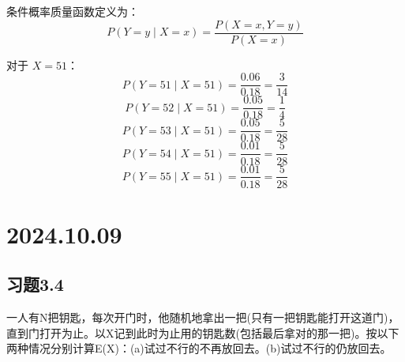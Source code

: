 \documentclass[UTF8]{report}
\theoremstyle{MyLineTheoremStyle} %
\theoremstyle{MyBlockTheoremStyle} %
\theoremstyle{MySubsubsectionStyle} %
\begin{document}
条件概率质量函数定义为：
\[
P(Y = y \mid X = x) = \frac{P(X = x, Y = y)}{P(X = x)}
\]

对于 \(X = 51\)：
\[
P(Y = 51 \mid X = 51) = \frac{0.06}{0.18} = \frac{3}{14}
\]
\[
P(Y = 52 \mid X = 51) = \frac{0.05}{0.18} = \frac{1}{4}
\]
\[
P(Y = 53 \mid X = 51) = \frac{0.05}{0.18} = \frac{5}{28}
\]
\[
P(Y = 54 \mid X = 51) = \frac{0.01}{0.18} = \frac{5}{28}
\]
\[
P(Y = 55 \mid X = 51) = \frac{0.01}{0.18} = \frac{5}{28}
\]






\chapter{2024.10.09}\thispagestyle{fancy}

\section{习题3.4}
一人有N把钥匙，每次开门时，他随机地拿出一把(只有一把钥匙能打开这道门)，直到门打开为止。以X记到此时为止用的钥匙数(包括最后拿对的那一把)。按以下两种情况分别计算E(X)：(a)试过不行的不再放回去。(b)试过不行的仍放回去。
\end{document}
